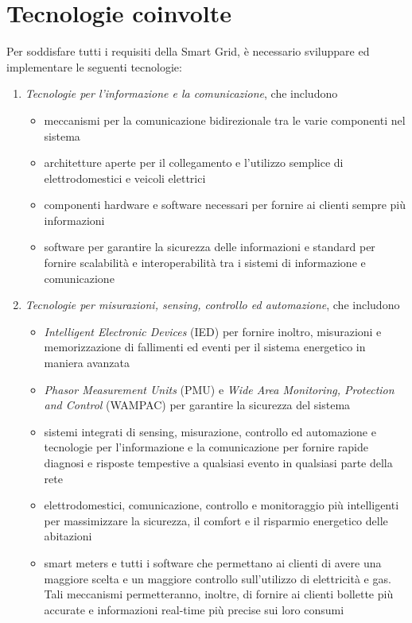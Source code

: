 \newpage
\section{Tecnologie coinvolte}
Per soddisfare tutti i requisiti della Smart Grid, è necessario sviluppare ed implementare le seguenti tecnologie:
\begin{enumerate}
\item \textit{Tecnologie per l'informazione e la comunicazione}, che includono
	\begin{itemize}
	\item meccanismi per la comunicazione bidirezionale tra le varie componenti nel sistema
	\item architetture aperte per il collegamento e l'utilizzo semplice di elettrodomestici e veicoli elettrici
	\item componenti hardware e software necessari per fornire ai clienti sempre più informazioni
	\item software per garantire la sicurezza delle informazioni e standard per fornire scalabilità e interoperabilità tra i sistemi di informazione e comunicazione
	\end{itemize} 
\item \textit{Tecnologie per misurazioni, sensing, controllo ed automazione}, che includono
	\begin{itemize}
	\item \textit{Intelligent Electronic Devices} (IED) per fornire inoltro, misurazioni e memorizzazione di fallimenti ed eventi per il sistema energetico in maniera avanzata
	\item \textit{Phasor Measurement Units} (PMU) e \textit{Wide Area Monitoring, Protection and Control} (WAMPAC) per garantire la sicurezza del sistema
	\item sistemi integrati di sensing, misurazione, controllo ed automazione e tecnologie per l'informazione e la comunicazione per fornire rapide diagnosi e risposte tempestive a qualsiasi evento in qualsiasi parte della rete
	\item elettrodomestici, comunicazione, controllo e monitoraggio più intelligenti per massimizzare la sicurezza, il comfort e il risparmio energetico delle abitazioni
	\item smart meters e tutti i software che permettano ai clienti di avere una maggiore scelta e un maggiore controllo sull'utilizzo di elettricità e gas. \newline Tali meccanismi permetteranno, inoltre, di fornire ai clienti bollette più accurate e informazioni real-time più precise sui loro consumi

\end{itemize}
\end{enumerate}

